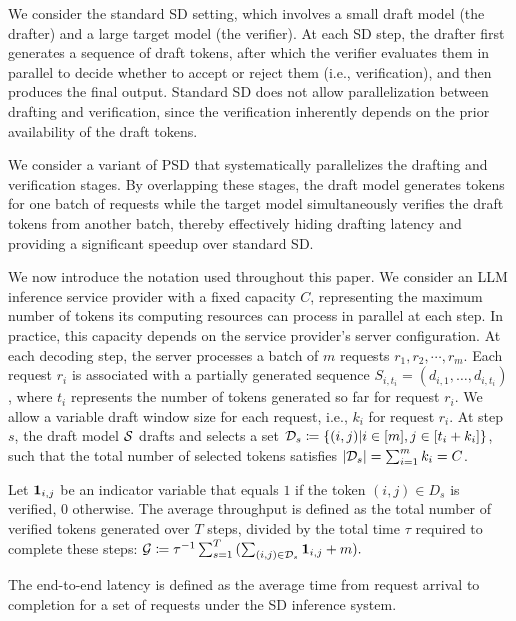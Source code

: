

We consider the standard SD setting, which involves a small draft model (the drafter) and a large target model (the verifier). 
At each SD step, the drafter first generates a sequence of draft tokens, after which the verifier evaluates them in parallel to decide whether to accept or reject them (i.e., verification), and then produces the final output. 
Standard SD does not allow parallelization between drafting and verification, since the verification inherently depends on the prior availability of the draft tokens. 

We consider a variant of PSD that systematically parallelizes the drafting and verification stages. By overlapping these stages, the draft model generates tokens for one batch of requests while the target model simultaneously verifies the draft tokens from another batch, thereby effectively hiding drafting latency and providing a significant speedup over standard SD.


We now introduce the notation used throughout this paper. We consider an LLM inference service provider with a fixed capacity $C$, representing the maximum number of tokens its computing resources can process in parallel at each step. 
In practice, this capacity depends on the service provider's server configuration.
At each decoding step, the server processes a batch of $m$ requests $r_1, r_2, \cdots, r_m$.
Each request $r_i$ is associated with a partially generated sequence $S_{i,t_i} = (d_{i,1}, \ldots, d_{i, t_i})$, where $t_i$ represents the number of tokens generated so far for request $r_i$. 
We allow a variable draft window size for each request, i.e., $k_i$ for request $r_i$. 
At step $s$, the draft model $\mathcal{S}$ drafts and selects a set $\mathcal{D}_s \coloneqq \{(i, j) | i \in [m], j \in [t_i+k_i]\}$, such that the total number of selected tokens satisfies $|\mathcal{D}_s| = \sum_{i=1}^{m} k_i = C$.


Let $\bm{1}_{i,j}$ be an indicator variable that equals $1$ if the token $(i,j) \in D_s$ is verified, $0$ otherwise.
The average throughput is defined as the total number of verified tokens generated over $T$ steps, divided by the total time $\tau$ required to complete these steps:
$
    \textstyle \mathcal{G} \coloneqq \tau^{-1}\sum_{s=1}^{T} {(\sum_{(i,j) \in \mathcal{D}_s}\bm{1}_{i,j}} + m ).
$


The end-to-end latency is defined as the average time from request arrival to completion for a set of requests under the SD inference system. 